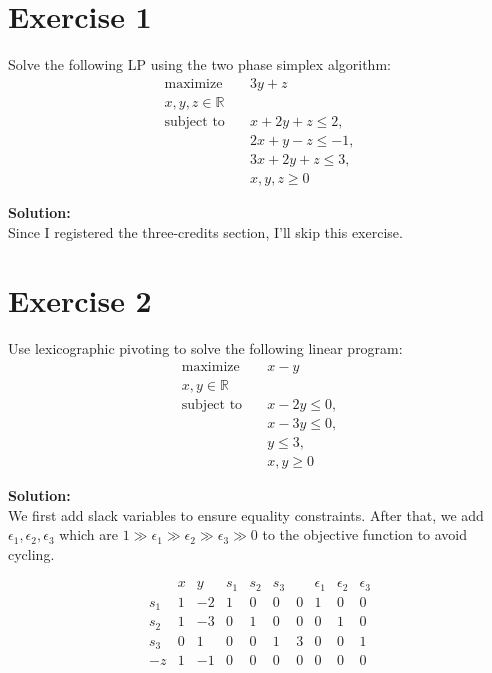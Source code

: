 \documentclass{article}
\begin{document}
\section*{Exercise 1}
Solve the following LP using the two phase simplex algorithm:
\begin{align*}
\text{maximize} \quad & 3y + z \\
x, y, z \in \mathbb{R} & \\
\text{subject to} \quad & x + 2y + z \leq 2, \\
& 2x + y - z \leq -1, \\
& 3x + 2y + z \leq 3, \\
& x, y, z \geq 0
\end{align*}

\textbf{Solution:} \\

Since I registered the three-credits section, I'll skip this exercise.

\newpage

\section*{Exercise 2}
Use lexicographic pivoting to solve the following linear program:
\begin{align*}
\text{maximize} \quad & x - y \\
x, y \in \mathbb{R} & \\
\text{subject to} \quad & x - 2y \leq 0, \\
& x - 3y \leq 0, \\
& y \leq 3, \\
& x, y \geq 0
\end{align*}

\textbf{Solution:} \\

We first add slack variables to ensure equality constraints. After that, we add $\epsilon_1, \epsilon_2, \epsilon_3$ which are $1 \gg \epsilon_1 \gg \epsilon_2 \gg \epsilon_3 \gg 0$ to the objective function to avoid cycling.

\[
\begin{array}{c|rrrrr|rrrrr}
 & x & y & s_1 & s_2 & s_3 & & \epsilon_1 & \epsilon_2 & \epsilon_3 \\
\hline
s_1 & 1 & -2 & 1 & 0 & 0 & 0 & 1 & 0 & 0 \\
s_2 & 1 & -3 & 0 & 1 & 0 & 0 & 0 & 1 & 0 \\
s_3 & 0 & 1 & 0 & 0 & 1 & 3 & 0 & 0 & 1 \\
\hline
-z & 1 & -1 & 0 & 0 & 0 & 0 & 0 & 0 & 0
\end{array}
\]
\end{document}
